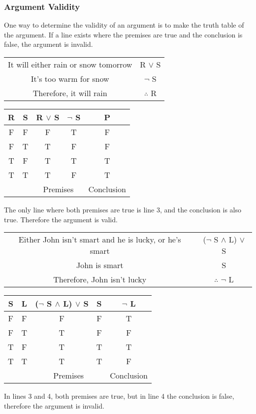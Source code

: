 \documentclass[11pt]{article}
\theoremstyle{definition}
\theoremstyle{remark}
\begin{document}
\subsubsection{Argument Validity}
One way to determine the validity of an argument is to make the truth table of the argument.
If a line exists where the premises are true and the conclusion is false, the argument is invalid.
\begin{center}
\begin{tabular}{ c | c  }
    It will either rain or snow tomorrow & R $\lor$ S \\
    It's too warm for snow & $\neg$ S \\
    \hline
    Therefore, it will rain & $\therefore$ R
\end{tabular}
\end{center}
\begin{center}
\begin{tabular}{ c  c | c  c | c} 
    R & S & R $\lor$ S & $\neg$ S & P \\
    \hline
    F & F & F & T & F \\ 
    F & T & T & F & F \\ 
    T & F & T & T & T \\ 
    T & T & T & F & T \\
    & & \multicolumn{2}{c}{Premises}& Conclusion
    \end{tabular}
\end{center}
The only line where both premises are true is line 3, and the conclusion is also true. Therefore the argument is valid.
\begin{center}
\begin{tabular}{ c | c  }
    Either John isn't smart and he is lucky, or he's smart & ($\neg$ S $\land$ L) $\lor$ S\\
    John is smart & S \\
    \hline
    Therefore, John isn't lucky & $\therefore$ $\neg$ L
\end{tabular}
\end{center}
\begin{center}
\begin{tabular}{ c  c | c  c | c} 
    S & L & ($\neg$ S $\land$ L) $\lor$ S & S & $\neg$ L \\
    \hline
    F & F & F & F & T \\ 
    F & T & T & F & F \\ 
    T & F & T & T & T \\ 
    T & T & T & T & F \\
    & & \multicolumn{2}{c}{Premises}& Conclusion
\end{tabular}
\end{center}
In lines 3 and 4, both premises are true, but in line 4 the conclusion is false, therefore the argument is invalid.
\end{document}
